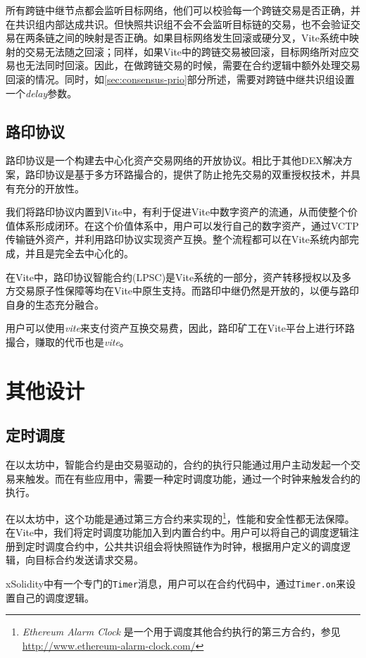 \documentclass[UTF8,nofonts]{ctexart}
\begin{document}
\begin{multicols}{2}
所有跨链中继节点都会监听目标网络，他们可以校验每一个跨链交易是否正确，并在共识组内部达成共识。但快照共识组不会不会监听目标链的交易，也不会验证交易在两条链之间的映射是否正确。如果目标网络发生回滚或硬分叉，Vite系统中映射的交易无法随之回滚；同样，如果Vite中的跨链交易被回滚，目标网络所对应交易也无法同时回滚。因此，在做跨链交易的时候，需要在合约逻辑中额外处理交易回滚的情况。同时，如\ref{sec:consensus-prio}部分所述，需要对跨链中继共识组设置一个\textit{delay}参数。

\subsection{路印协议}
路印协议\cite{loopring}是一个构建去中心化资产交易网络的开放协议。相比于其他DEX解决方案，路印协议是基于多方环路撮合的，提供了防止抢先交易的双重授权技术，并具有充分的开放性。

我们将路印协议内置到Vite中，有利于促进Vite中数字资产的流通，从而使整个价值体系形成闭环。在这个价值体系中，用户可以发行自己的数字资产，通过VCTP传输链外资产，并利用路印协议实现资产互换。整个流程都可以在Vite系统内部完成，并且是完全去中心化的。

在Vite中，路印协议智能合约(LPSC)是Vite系统的一部分，资产转移授权以及多方交易原子性保障等均在Vite中原生支持。而路印中继仍然是开放的，以便与路印自身的生态充分融合。

用户可以使用\textit{vite}来支付资产互换交易费，因此，路印矿工在Vite平台上进行环路撮合，赚取的代币也是\textit{vite}。

\section{其他设计}
\subsection{定时调度}
在以太坊中，智能合约是由交易驱动的，合约的执行只能通过用户主动发起一个交易来触发。而在有些应用中，需要一种定时调度功能，通过一个时钟来触发合约的执行。

在以太坊中，这个功能是通过第三方合约来实现的\footnote{\textit{Ethereum Alarm Clock} 是一个用于调度其他合约执行的第三方合约，参见 \url{http://www.ethereum-alarm-clock.com/}}，性能和安全性都无法保障。在Vite中，我们将定时调度功能加入到内置合约中。用户可以将自己的调度逻辑注册到定时调度合约中，公共共识组会将快照链作为时钟，根据用户定义的调度逻辑，向目标合约发送请求交易。

xSolidity中有一个专门的\texttt{Timer}消息，用户可以在合约代码中，通过\texttt{Timer.on}来设置自己的调度逻辑。


\end{multicols}
\end{document}
